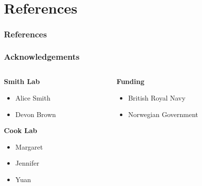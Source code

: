 \documentclass[
	11pt, %
	aspectratio=169, %
]{beamer}
\begin{document}

\section{References}


\begin{frame} %
	\frametitle{References}
	
	\printbibliography
	
	
\end{frame}


\begin{frame}
	\frametitle{Acknowledgements}
	
	\begin{columns}[t] %
		\begin{column}{0.45\textwidth} %
			\textbf{Smith Lab}
			\begin{itemize}
				\item Alice Smith
				\item Devon Brown
			\end{itemize}
			\textbf{Cook Lab}
			\begin{itemize}
				\item Margaret
				\item Jennifer
				\item Yuan
			\end{itemize}
		\end{column}		
		\begin{column}{0.5\textwidth} %
			\textbf{Funding}
			\begin{itemize}
				\item British Royal Navy
				\item Norwegian Government
			\end{itemize}
		\end{column}
	\end{columns}
\end{frame}
\end{document}
